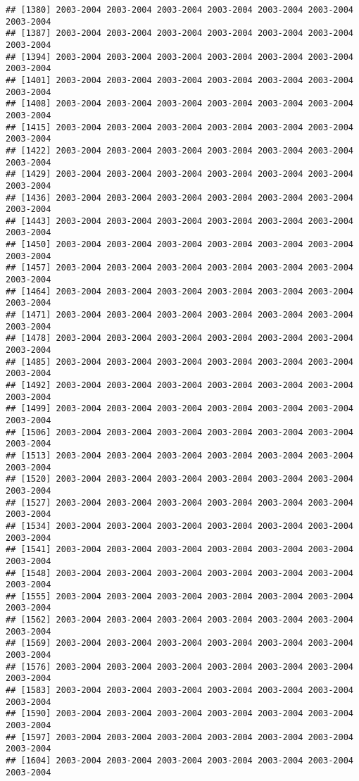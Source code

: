 \documentclass[
]{article}
\begin{document}
\begin{verbatim}
## [1380] 2003-2004 2003-2004 2003-2004 2003-2004 2003-2004 2003-2004 2003-2004
## [1387] 2003-2004 2003-2004 2003-2004 2003-2004 2003-2004 2003-2004 2003-2004
## [1394] 2003-2004 2003-2004 2003-2004 2003-2004 2003-2004 2003-2004 2003-2004
## [1401] 2003-2004 2003-2004 2003-2004 2003-2004 2003-2004 2003-2004 2003-2004
## [1408] 2003-2004 2003-2004 2003-2004 2003-2004 2003-2004 2003-2004 2003-2004
## [1415] 2003-2004 2003-2004 2003-2004 2003-2004 2003-2004 2003-2004 2003-2004
## [1422] 2003-2004 2003-2004 2003-2004 2003-2004 2003-2004 2003-2004 2003-2004
## [1429] 2003-2004 2003-2004 2003-2004 2003-2004 2003-2004 2003-2004 2003-2004
## [1436] 2003-2004 2003-2004 2003-2004 2003-2004 2003-2004 2003-2004 2003-2004
## [1443] 2003-2004 2003-2004 2003-2004 2003-2004 2003-2004 2003-2004 2003-2004
## [1450] 2003-2004 2003-2004 2003-2004 2003-2004 2003-2004 2003-2004 2003-2004
## [1457] 2003-2004 2003-2004 2003-2004 2003-2004 2003-2004 2003-2004 2003-2004
## [1464] 2003-2004 2003-2004 2003-2004 2003-2004 2003-2004 2003-2004 2003-2004
## [1471] 2003-2004 2003-2004 2003-2004 2003-2004 2003-2004 2003-2004 2003-2004
## [1478] 2003-2004 2003-2004 2003-2004 2003-2004 2003-2004 2003-2004 2003-2004
## [1485] 2003-2004 2003-2004 2003-2004 2003-2004 2003-2004 2003-2004 2003-2004
## [1492] 2003-2004 2003-2004 2003-2004 2003-2004 2003-2004 2003-2004 2003-2004
## [1499] 2003-2004 2003-2004 2003-2004 2003-2004 2003-2004 2003-2004 2003-2004
## [1506] 2003-2004 2003-2004 2003-2004 2003-2004 2003-2004 2003-2004 2003-2004
## [1513] 2003-2004 2003-2004 2003-2004 2003-2004 2003-2004 2003-2004 2003-2004
## [1520] 2003-2004 2003-2004 2003-2004 2003-2004 2003-2004 2003-2004 2003-2004
## [1527] 2003-2004 2003-2004 2003-2004 2003-2004 2003-2004 2003-2004 2003-2004
## [1534] 2003-2004 2003-2004 2003-2004 2003-2004 2003-2004 2003-2004 2003-2004
## [1541] 2003-2004 2003-2004 2003-2004 2003-2004 2003-2004 2003-2004 2003-2004
## [1548] 2003-2004 2003-2004 2003-2004 2003-2004 2003-2004 2003-2004 2003-2004
## [1555] 2003-2004 2003-2004 2003-2004 2003-2004 2003-2004 2003-2004 2003-2004
## [1562] 2003-2004 2003-2004 2003-2004 2003-2004 2003-2004 2003-2004 2003-2004
## [1569] 2003-2004 2003-2004 2003-2004 2003-2004 2003-2004 2003-2004 2003-2004
## [1576] 2003-2004 2003-2004 2003-2004 2003-2004 2003-2004 2003-2004 2003-2004
## [1583] 2003-2004 2003-2004 2003-2004 2003-2004 2003-2004 2003-2004 2003-2004
## [1590] 2003-2004 2003-2004 2003-2004 2003-2004 2003-2004 2003-2004 2003-2004
## [1597] 2003-2004 2003-2004 2003-2004 2003-2004 2003-2004 2003-2004 2003-2004
## [1604] 2003-2004 2003-2004 2003-2004 2003-2004 2003-2004 2003-2004 2003-2004

\end{verbatim}
\end{document}
